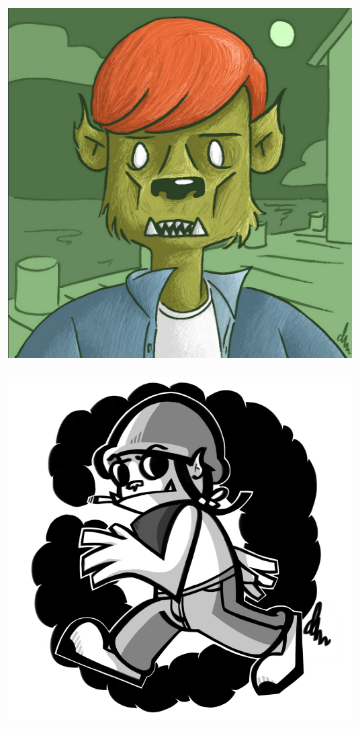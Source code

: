 \begin{figure}[H]
\begin{subfigure}{.35\textwidth}
    \includegraphics[width=.9\linewidth]{images/ref_IAN02}
  \end{subfigure}
  \begin{subfigure}{.3\textwidth}
    \centering
    \includegraphics[width=.9\linewidth]{images/ref_IAN03}
  \end{subfigure}
  \begin{subfigure}{.4\textwidth}

\end{subfigure}
\end{figure}
